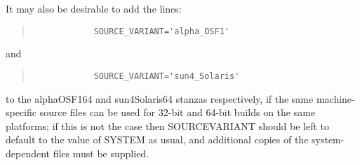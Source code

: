 \documentclass[twoside,11pt]{article}
\renewcommand{\_}{\texttt{\symbol{95}}}
\newenvironment{squote}{\begin{quote}\begin{small}}{\end{small}\end{quote}}
\begin{document}
It may also be desirable to add the lines:
\begin{squote}
\begin{verbatim}
            SOURCE_VARIANT='alpha_OSF1'
\end{verbatim}
\end{squote}
and 
\begin{squote}
\begin{verbatim}
            SOURCE_VARIANT='sun4_Solaris'
\end{verbatim}
\end{squote}
to the alpha\_OSF1\_64 and sun4\_Solaris\_64 stanzas respectively,
if the same
machine-specific source files can be used for 32-bit and 64-bit 
builds on the same platforms; if this is not the case then SOURCE\_VARIANT
should be left to default to the value of SYSTEM as usual,
and additional copies of the system-dependent files must be supplied.
\end{document}
